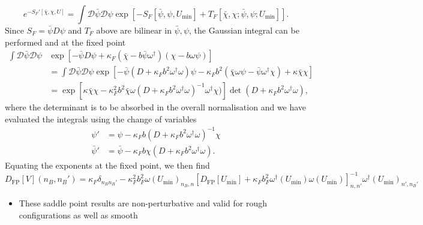 \begin{equation}
    e^{-S_F'[\bar{\chi}, \chi, U]} = \int \mathcal{D}\bar{\psi}\mathcal{D}\psi \exp[-S_F[\bar{\psi}, \psi, U_\text{min}] + T_F[\bar{\chi}, \chi; \bar{\psi}, \psi; U_\text{min}]].
\end{equation}
Since $S_F = \bar{\psi}D \psi$ and $T_F$ above are bilinear in $\bar{\psi}, \psi$, the Gaussian integral can be performed and at the fixed point
\begin{align}
    \int \mathcal{D} \bar{\psi} \mathcal{D}\psi & \exp[-\bar{\psi} D \psi + \kappa_F(\bar{\chi} - b \bar{\psi} \omega^\dagger)(\chi - b \omega \psi)] \\ &= \int \mathcal{D} \bar{\psi} \mathcal{D}\psi \exp[-\bar{\psi}(D+ \kappa_F b^2 \omega^\dagger \omega)\psi - \kappa_F b^2(\bar{\chi} \omega \psi - \bar{\psi} \omega^\dagger \chi) + \kappa \bar{\chi} \chi] \\
    & = \exp[\kappa \bar{\chi} \chi - \kappa_F^2 b^2 \bar{\chi} \omega (D + \kappa_F b^2 \omega^\dagger \omega)^{-1}\omega^\dagger \chi)]\operatorname{det}(D + \kappa_F b^2 \omega^\dagger \omega),
\end{align}
where the determinant is to be absorbed in the overall normalisation and we have evaluated the integrals using the change of variables
\begin{align}
    \psi' &= \psi - \kappa_F b (D + \kappa_F b^2 \omega^\dagger \omega)^{-1}\chi \\
    \bar{\psi}' &= \bar{\psi} - \kappa_F b \chi(D + \kappa_F b^2 \omega^\dagger \omega).
\end{align}
Equating the exponents at the fixed point, we then find
\begin{equation}
\label{eq:saddle_point_D}
    D_\text{FP}[V](n_B, n_B') = \kappa_F \delta_{n_B n_B'} - \kappa_F^2 b_F^2 \omega(U_\text{min})_{n_B, n}[D_\text{FP}[U_\text{min}] + \kappa_F b_F^2 \omega^\dagger(U_\text{min})\omega(U_\text{min})]^{-1}_{n,n'}\omega^\dagger(U_\text{min})_{n', n_B'}
\end{equation}
\begin{itemize}
    \item These saddle point results are non-perturbative and valid for rough configurations as well as smooth
\end{itemize}

